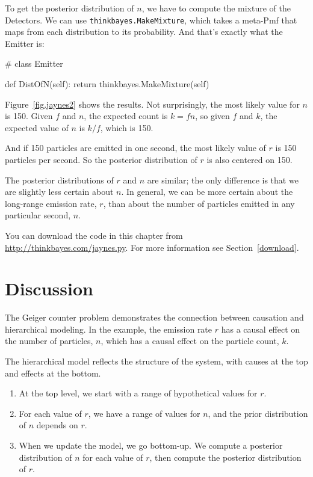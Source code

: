 \documentclass[12pt]{book}
\theoremstyle{exercise}
\begin{document}
To get the posterior distribution of $n$, we have to compute
the mixture of the Detectors.  We can use 
{\tt thinkbayes.MakeMixture}, which takes a meta-Pmf that maps
from each distribution to its probability.  And that's exactly
what the Emitter is:

\begin{code}
# class Emitter

    def DistOfN(self):
        return thinkbayes.MakeMixture(self)
\end{code}

Figure~\ref{fig.jaynes2} shows the results.  Not surprisingly, the
most likely value for $n$ is 150.  Given $f$ and $n$, the expected
count is $k = f n$, so given $f$ and $k$, the expected value of $n$ is
$k / f$, which is 150.

And if 150 particles are emitted in one second, the most likely value
of $r$ is 150 particles per second.  So the posterior distribution of
$r$ is also centered on 150.

The posterior distributions of $r$ and $n$ are similar;
the only difference is that we are slightly less certain about $n$.
In general, we can be more certain about the long-range emission rate,
$r$, than about the number of particles emitted in any particular second,
$n$.

You can download the code in this chapter from
\url{http://thinkbayes.com/jaynes.py}.  For more information see
Section~\ref{download}.


\section{Discussion}

The Geiger counter problem demonstrates the connection between
causation and hierarchical modeling.  In the example, the
emission rate $r$ has a causal effect on the number of particles,
$n$, which has a causal effect on the particle count, $k$.

The hierarchical model reflects the structure of the
system, with causes at the top and effects at the bottom.

\begin{enumerate}

\item At the top level, we start with a range of hypothetical
values for $r$.

\item For each value of $r$, we have a range of values for $n$,
and the prior distribution of $n$ depends on $r$.

\item When we update the model, we go bottom-up.  We compute
a posterior distribution of $n$ for each value of $r$, then
compute the posterior distribution of $r$.

\end{enumerate}
\end{document}

